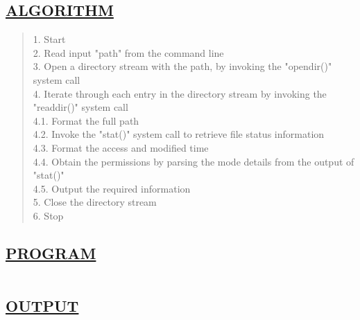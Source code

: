 \documentclass[a4paper, 12pt]{article}
\begin{document}
\subsection*{\underline{ALGORITHM}}
\begin{quote}
1. Start\\
2. Read input "path" from the command line\\
3. Open a directory stream with the path, by invoking the "opendir()" system call\\
4. Iterate through each entry in the directory stream by invoking the "readdir()" system \hspace*{0.4cm} call\\
\hspace*{1cm} 4.1. Format the full path\\
\hspace*{1cm} 4.2. Invoke the "stat()" system call to retrieve file status information\\
\hspace*{1cm} 4.3. Format the access and modified time\\
\hspace*{1cm} 4.4. Obtain the permissions by parsing the mode details from the output of "stat()"\\
\hspace*{1cm} 4.5. Output the required information\\
5. Close the directory stream\\
6. Stop\\
\end{quote}

\subsection*{\underline{PROGRAM}}
\begin{quote}
\inputminted[fontsize=\small,breaklines,breakanywhere]{c}{file_listing.c}
\end{quote}

\newpage
\subsection*{\underline{OUTPUT}}

\begin{figure}[H] 
    \centering
\end{figure}
\end{document}
